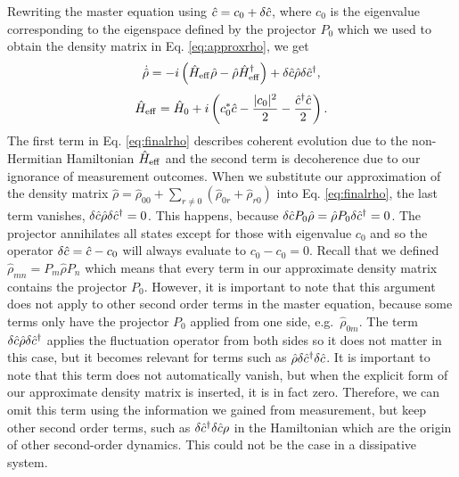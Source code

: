 Rewriting the master equation using $\hat{c} = c_0 + \delta \hat{c}$, where
$c_0$ is the eigenvalue corresponding to the eigenspace defined by the
projector $P_0$ which we used to obtain the density matrix in
Eq. \eqref{eq:approxrho}, we get
\begin{equation}
  \label{eq:finalrho}
  \dot{\hat{\rho}} = -i \left( \hat{H}_\mathrm{eff} \hat{\rho} - \hat{\rho}
  \hat{H}_\mathrm{eff}^\dagger \right) + \delta \hat{c} \hat{\rho} \delta \hat{c}^\dagger,
\end{equation}
\begin{equation}
  \label{eq:Ham}
  \hat{H}_\mathrm{eff} = \hat{H}_0 + i \left( c_0^*\hat{c} - \frac{|c_0|^2}{2} - \frac{\hat{c}^\dagger\hat{c}}{2} \right).
\end{equation}
The first term in Eq. \eqref{eq:finalrho} describes coherent evolution
due to the non-Hermitian Hamiltonian $\hat{H}_\mathrm{eff}$ and the second
term is decoherence due to our ignorance of measurement outcomes. When
we substitute our approximation of the density matrix
$\hat{\rho} = \hat{\rho}_{00} + \sum_{r\ne0} (\hat{\rho}_{0r} +
\hat{\rho}_{r0})$ into Eq. \eqref{eq:finalrho}, the last term
vanishes, $\delta \hat{c} \hat{\rho} \delta \hat{c}^\dagger = 0$. This happens, because
$\delta \hat{c} P_0 \hat{\rho} = \hat{\rho} P_0 \delta \hat{c}^\dagger = 0$. The
projector annihilates all states except for those with eigenvalue
$c_0$ and so the operator $\delta \hat{c} = \hat{c} - c_0$ will always evaluate
to $c_0 - c_0 = 0$. Recall that we defined
$\hat{\rho}_{mn} = P_m \hat{\rho} P_n$ which means that every term in
our approximate density matrix contains the projector $P_0$. However,
it is important to note that this argument does not apply to other
second order terms in the master equation, because some terms only
have the projector $P_0$ applied from one side,
e.g.~$\hat{\rho}_{0m}$. The term $\delta \hat{c} \hat{\rho} \delta \hat{c}^\dagger$
applies the fluctuation operator from both sides so it does not matter
in this case, but it becomes relevant for terms such as
$ \hat{\rho} \delta \hat{c}^\dagger \delta \hat{c}$. It is important to note that this
term does not automatically vanish, but when the explicit form of our
approximate density matrix is inserted, it is in fact zero. Therefore,
we can omit this term using the information we gained from
measurement, but keep other second order terms, such as
$\delta \hat{c}^\dagger \delta \hat{c} \rho$ in the Hamiltonian which are the origin of
other second-order dynamics. This could not be the case in a
dissipative system.


